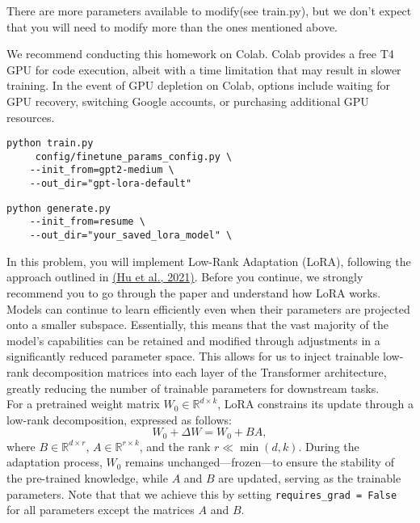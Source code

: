 \documentclass[11pt,addpoints,answers]{exam}
\begin{document}
\begin{questions}
There are more parameters available to modify(see train.py), but we don't expect that you will need to modify more than the ones mentioned above.


We recommend conducting this homework on Colab. Colab provides a free T4 GPU for code execution, albeit with a time limitation that may result in slower training. In the event of GPU depletion on Colab, options include waiting for GPU recovery, switching Google accounts, or purchasing additional GPU resources.

\begin{lstlisting}
python train.py 
     config/finetune_params_config.py \
    --init_from=gpt2-medium \
    --out_dir="gpt-lora-default"
\end{lstlisting}

\begin{lstlisting}
python generate.py 
    --init_from=resume \
    --out_dir="your_saved_lora_model" \
\end{lstlisting}

    





In this problem, you will implement Low-Rank Adaptation (LoRA), following the approach outlined in \href{https://arxiv.org/pdf/2106.09685.pdf}{(Hu et al., 2021)}. Before you continue, we strongly recommend you to go through the paper and understand how LoRA works. \\
Models can continue to learn efficiently even when their parameters are projected onto a smaller subspace. Essentially, this means that the vast majority of the model's capabilities can be retained and modified through adjustments in a significantly reduced parameter space. This allows for us to inject trainable low-rank decomposition matrices into each layer of the Transformer architecture, greatly reducing the number of trainable parameters for downstream tasks.\\
For a pretrained weight matrix \(W_0 \in \mathbb{R}^{d \times k}\), LoRA constrains its update through a low-rank decomposition, expressed as follows:
\[W_0 + \Delta W = W_0 + BA,\]
where \(B \in \mathbb{R}^{d \times r}\), \(A \in \mathbb{R}^{r \times k}\), and the rank  \(r \ll \min(d,k)\). During the adaptation process, \(W_0\) remains unchanged—frozen—to ensure the stability of the pre-trained knowledge, while \(A\) and \(B\) are updated, serving as the trainable parameters. Note that that we achieve this by setting \texttt{requires\_grad = False} for all parameters except the matrices \(A\) and \(B\).


\end{questions}
\end{document}
